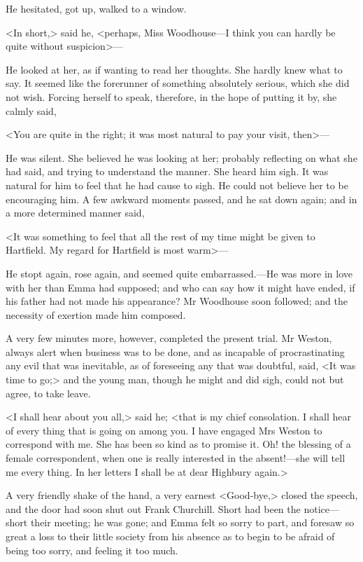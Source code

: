 He hesitated, got up, walked to a window.

<In short,> said he, <perhaps, Miss Woodhouse—I think you can hardly be quite without suspicion>—

He looked at her, as if wanting to read her thoughts. She hardly knew what to say. It seemed like the forerunner of something absolutely serious, which she did not wish. Forcing herself to speak, therefore, in the hope of putting it by, she calmly said,

<You are quite in the right; it was most natural to pay your visit, then>—

He was silent. She believed he was looking at her; probably reflecting on what she had said, and trying to understand the manner. She heard him sigh. It was natural for him to feel that he had cause to sigh. He could not believe her to be encouraging him. A few awkward moments passed, and he sat down again; and in a more determined manner said,

<It was something to feel that all the rest of my time might be given to Hartfield. My regard for Hartfield is most warm>—

He stopt again, rose again, and seemed quite embarrassed.—He was more in love with her than Emma had supposed; and who can say how it might have ended, if his father had not made his appearance? Mr Woodhouse soon followed; and the necessity of exertion made him composed.

A very few minutes more, however, completed the present trial. Mr Weston, always alert when business was to be done, and as incapable of procrastinating any evil that was inevitable, as of foreseeing any that was doubtful, said, <It was time to go;> and the young man, though he might and did sigh, could not but agree, to take leave.

<I shall hear about you all,> said he; <that is my chief consolation. I shall hear of every thing that is going on among you. I have engaged Mrs Weston to correspond with me. She has been so kind as to promise it. Oh! the blessing of a female correspondent, when one is really interested in the absent!—she will tell me every thing. In her letters I shall be at dear Highbury again.>

A very friendly shake of the hand, a very earnest <Good-bye,> closed the speech, and the door had soon shut out Frank Churchill. Short had been the notice—short their meeting; he was gone; and Emma felt so sorry to part, and foresaw so great a loss to their little society from his absence as to begin to be afraid of being too sorry, and feeling it too much.

